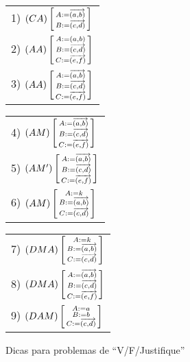 \documentclass[oneside]{book}
\begin{document}
\begin{tabular}[t]{l}
1) $(CA)\subst{A:=\vab \\ B:=\vcd \\}$            \\
2) $(AA)\subst{A:=\pab \\ B:=\vcd \\ C:=\vef \\}$ \\
3) $(AA)\subst{A:=\vab \\ B:=\vcd \\ C:=\vef \\}$ \\
\end{tabular}
\quad
\begin{tabular}[t]{l}
4) $(AM) \subst{A:=\vab \\ B:=\vcd \\ C:=\vef \\}$ \\
5) $(AM')\subst{A:=\vab \\ B:=\vcd \\ C:=\vef \\}$ \\
6) $(AM) \subst{A:=k    \\ B:=\vab \\ C:=\vcd \\}$ \\
\end{tabular}
\quad
\begin{tabular}[t]{l}
7) $(DMA) \subst{A:=k    \\ B:=\vab \\ C:=\vcd \\}$ \\
8) $(DMA) \subst{A:=\vab \\ B:=\vcd \\ C:=\vef \\}$ \\
9) $(DAM) \subst{A:=a    \\ B:=b    \\ C:=\vcd \\}$ \\
\end{tabular}




\newpage

%
 {Dicas para problemas de ``V/F/Justifique''}
\end{document}

